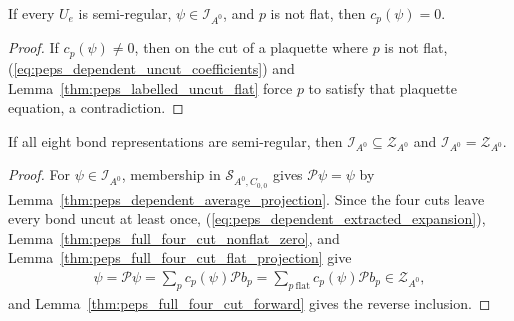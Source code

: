 \begin{lemma}%
    \label{thm:peps_full_four_cut_nonflat_zero}
    \leanok
    If every $U_e$ is semi-regular, $\psi\in\mathcal I_{A^0}$, and $p$ is
    not flat, then $c_p(\psi)=0$.
\end{lemma}
\begin{proof}\leanok
    If $c_p(\psi)\ne0$, then on the cut of a plaquette where $p$ is not flat,
    (\ref{eq:peps_dependent_uncut_coefficients}) and
    Lemma~\ref{thm:peps_labelled_uncut_flat} force $p$ to satisfy that
    plaquette equation, a contradiction.
\end{proof}

\begin{lemma}%
    \label{thm:peps_full_four_cut_canonical_equality}
    \leanok
    If all eight bond representations are semi-regular, then
    $\mathcal I_{A^0}\subseteq\mathcal Z_{A^0}$ and
    $\mathcal I_{A^0}=\mathcal Z_{A^0}$.
\end{lemma}
\begin{proof}\leanok
    For $\psi\in\mathcal I_{A^0}$, membership in $\mathcal S_{A^0,C_{0,0}}$
    gives $\mathcal P\psi=\psi$ by
    Lemma~\ref{thm:peps_dependent_average_projection}. Since the four cuts
    leave every bond uncut at least once, (\ref{eq:peps_dependent_extracted_expansion}),
    Lemma~\ref{thm:peps_full_four_cut_nonflat_zero}, and
    Lemma~\ref{thm:peps_full_four_cut_flat_projection} give
    \begin{align}
        \psi=\mathcal P\psi=\sum_p c_p(\psi)\mathcal P b_p
        =\sum_{p\ \mathrm{flat}}c_p(\psi)\mathcal P b_p
        \in\mathcal Z_{A^0},
        \label{eq:peps_full_four_cut_reconstruction}
    \end{align}
    and Lemma~\ref{thm:peps_full_four_cut_forward} gives the reverse inclusion.
\end{proof}
